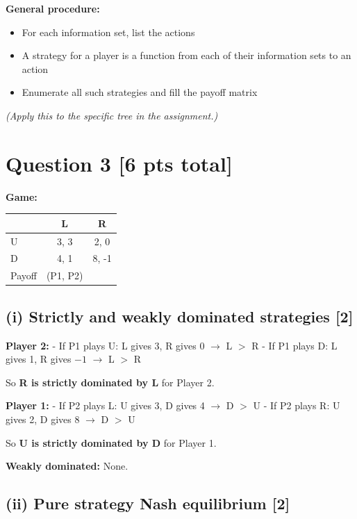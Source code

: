 \documentclass[
]{article}
\newcounter{none} %
\providecommand{\tightlist}{%
  \setlength{\itemsep}{0pt}\setlength{\parskip}{0pt}}
\begin{document}
\textbf{General procedure:}

\begin{itemize}
\tightlist
\item
  For each information set, list the actions
\item
  A strategy for a player is a function from each of their information
  sets to an action
\item
  Enumerate all such strategies and fill the payoff matrix
\end{itemize}

\emph{(Apply this to the specific tree in the assignment.)}

\newpage

\section{Question 3 {[}6 pts total{]}}\label{question-3-6-pts-total}

\textbf{Game:}

{\def\LTcaptype{none} %
\begin{longtable}[]{@{}lcc@{}}
\toprule\noalign{}
& L & R \\
\midrule\noalign{}
\endhead
\bottomrule\noalign{}
\endlastfoot
U & 3, 3 & 2, 0 \\
D & 4, 1 & 8, -1 \\
Payoff & (P1, P2) & \\
\end{longtable}
}

\subsection{(i) Strictly and weakly dominated strategies
{[}2{]}}\label{i-strictly-and-weakly-dominated-strategies-2}

\textbf{Player 2:} - If P1 plays U: L gives 3, R gives 0 \(\rightarrow\)
L \(>\) R - If P1 plays D: L gives 1, R gives \(-1\) \(\rightarrow\) L
\(>\) R

So \textbf{R is strictly dominated by L} for Player 2.

\textbf{Player 1:} - If P2 plays L: U gives 3, D gives 4 \(\rightarrow\)
D \(>\) U - If P2 plays R: U gives 2, D gives 8 \(\rightarrow\) D \(>\)
U

So \textbf{U is strictly dominated by D} for Player 1.

\textbf{Weakly dominated:} None.

\subsection{(ii) Pure strategy Nash equilibrium
{[}2{]}}\label{ii-pure-strategy-nash-equilibrium-2}
\end{document}
